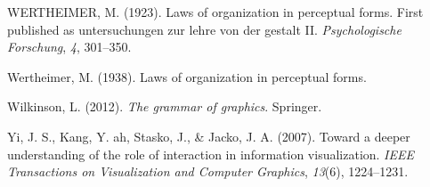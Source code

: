 \documentclass[print]{nuthesis}
\newlength{\cslhangindent}
\newenvironment{CSLReferences}[2]%
{\setlength{\parindent}{0pt}%
\everypar{\setlength{\hangindent}{\cslhangindent}}\ignorespaces}%
{\par}
\begin{document}
\begin{CSLReferences}{1}{0}
\leavevmode{}%
WERTHEIMER, M. (1923). Laws of organization in perceptual forms. First published as untersuchungen zur lehre von der gestalt II. \emph{Psychologische Forschung}, \emph{4}, 301--350.

\leavevmode{}%
Wertheimer, M. (1938). Laws of organization in perceptual forms.

\leavevmode{}%
Wilkinson, L. (2012). \emph{The grammar of graphics}. Springer.

\leavevmode{}%
Yi, J. S., Kang, Y. ah, Stasko, J., \& Jacko, J. A. (2007). Toward a deeper understanding of the role of interaction in information visualization. \emph{IEEE Transactions on Visualization and Computer Graphics}, \emph{13}(6), 1224--1231.

\end{CSLReferences}


\backmatter

% 






\end{document}
